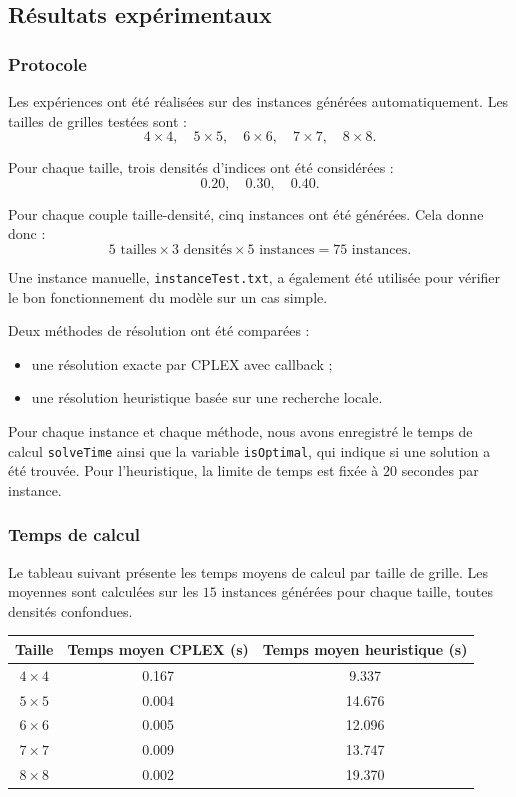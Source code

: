 \subsection{Résultats expérimentaux}

\subsubsection{Protocole}

Les expériences ont été réalisées sur des instances générées automatiquement. Les tailles de grilles testées sont :
\[
4 \times 4,\quad 5 \times 5,\quad 6 \times 6,\quad 7 \times 7,\quad 8 \times 8.
\]

Pour chaque taille, trois densités d'indices ont été considérées :
\[
0.20,\quad 0.30,\quad 0.40.
\]

Pour chaque couple taille-densité, cinq instances ont été générées. Cela donne donc :
\[
5 \text{ tailles} \times 3 \text{ densités} \times 5 \text{ instances}
= 75 \text{ instances}.
\]

Une instance manuelle, \texttt{instanceTest.txt}, a également été utilisée pour vérifier le bon fonctionnement du modèle sur un cas simple.

Deux méthodes de résolution ont été comparées :
\begin{itemize}
    \item une résolution exacte par CPLEX avec callback ;
    \item une résolution heuristique basée sur une recherche locale.
\end{itemize}

Pour chaque instance et chaque méthode, nous avons enregistré le temps de calcul \texttt{solveTime} ainsi que la variable \texttt{isOptimal}, qui indique si une solution a été trouvée. Pour l'heuristique, la limite de temps est fixée à \(20\) secondes par instance.

\subsubsection{Temps de calcul}

Le tableau suivant présente les temps moyens de calcul par taille de grille. Les moyennes sont calculées sur les \(15\) instances générées pour chaque taille, toutes densités confondues.

\begin{center}
\renewcommand{\arraystretch}{1.2}
\begin{tabular}{c|c|c}
\hline
\textbf{Taille} & \textbf{Temps moyen CPLEX (s)} & \textbf{Temps moyen heuristique (s)} \\
\hline
\(4 \times 4\) & 0.167 & 9.337 \\
\(5 \times 5\) & 0.004 & 14.676 \\
\(6 \times 6\) & 0.005 & 12.096 \\
\(7 \times 7\) & 0.009 & 13.747 \\
\(8 \times 8\) & 0.002 & 19.370 \\
\hline
\end{tabular}
\end{center}

